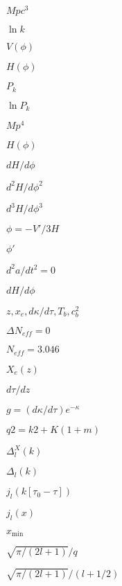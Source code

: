 \documentclass{article}
\begin{document}
$Mpc^3$
\pagebreak

$ \ln{k}$
\pagebreak

$V(\phi)$
\pagebreak

$H(\phi)$
\pagebreak

$ P_k $
\pagebreak

$ \ln{P_k} $
\pagebreak

$ Mp^4$
\pagebreak

$ H(\phi)$
\pagebreak

$ dH / d\phi $
\pagebreak

$ d^2H / d\phi^2 $
\pagebreak

$ d^3H / d\phi^3 $
\pagebreak

$ \phi=-V'/3H$
\pagebreak

$\phi'$
\pagebreak

$ d^2a/dt^2 = 0$
\pagebreak

$ dH/d\phi$
\pagebreak

$ z, x_e, d \kappa / d \tau, T_b, c_b^2 $
\pagebreak

$ \Delta N_{eff}=0$
\pagebreak

$ N_{eff}=3.046$
\pagebreak

$ X_e(z) $
\pagebreak

$ d \tau / dz $
\pagebreak

$ g= (d \kappa/d \tau) e^{- \kappa} $
\pagebreak

$ q2 = k2 + K(1+m)$
\pagebreak

$ \Delta_l^{X} (k) $
\pagebreak

$ \Delta_l(k) $
\pagebreak

$ j_l(k[\tau_0-\tau]) $
\pagebreak

$ j_l(x) $
\pagebreak

$ x_{\min} $
\pagebreak

$ \sqrt{\pi/(2l+1)}/q $
\pagebreak

$ \sqrt{\pi/(2l+1)}/(l+1/2)$
\pagebreak
\end{document}

